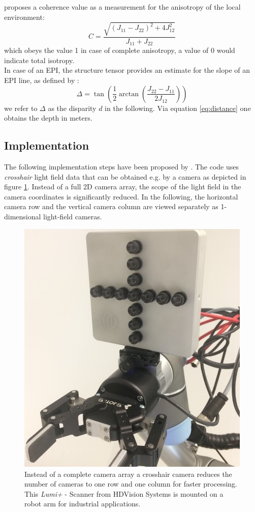 \documentclass  [
  paper    = a4,
  BCOR     = 10mm,
  twoside,
  fontsize = 12pt,
  fleqn,
  toc      = bibnumbered,
  toc      = listofnumbered,
  numbers  = noendperiod,
  headings = normal,
  listof   = leveldown,
  version  = 3.03
]                                       {scrreprt}
\begin{document}
   \cite{jahne2013digitale} proposes a coherence value as a measurement for the anisotropy of the local environment:
 \begin{equation}\label{eq:coherence}
 C = \frac{\sqrt{(J_{11} - J_{22})^2 + 4J_{12}^2}}{J_{11} + J_{22}}
 \end{equation}
 which obeys the value 1 in case of complete anisotropy, a value of 0 would indicate total isotropy.\\
 In case of an EPI, the structure tensor provides an estimate for the slope of an EPI line, as defined by \cite{bigun1987optimal}:
 \begin{equation}\label{eq:disparity}
 \Delta = \tan\left(\frac{1}{2} \arctan\left( \frac{J_{22}-J_{11}}{2J_{12}}\right)\right)
 \end{equation}
 we refer to $\Delta$ as the disparity $d$ in the following. Via equation \ref{eq:distance} one obtains the depth in meters.
 
 \subsection{Implementation}
 The following implementation steps have been proposed by \cite{wanner2014orientation}. The code uses \textit{crosshair} light field data that can be obtained e.g. by a camera as depicted in figure \ref{fig:lumiplus}. Instead of a full 2D camera array, the scope of the light field in the camera coordinates is significantly reduced. In the following, the horizontal camera row and the vertical camera column are viewed separately as 1-dimensional light-field cameras.\\
 \begin{figure}[h!]
 	\centering
 	\includegraphics[width=0.5\linewidth]{images/Lumiplus}
 	\caption[LumiPlus Scanner from HDVision Systems]{Instead of a complete camera array a crosshair camera reduces the number of cameras to one row and one column for faster processing. This \textit{Lumi+} - Scanner from HDVision Systems is mounted on a robot arm for industrial applications.}
 	\label{fig:lumiplus}
 \end{figure}
 
\end{document}

